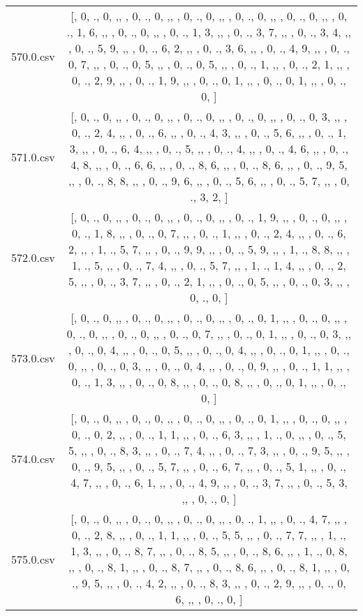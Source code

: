 \begin{table}[ht]
\begin{tabular}{@{}c c@{}}
	570.0.csv & [, 0, ., 0, ,,  , 0, ., 0, ,,  , 0, ., 0, ,,  , 0, ., 0, ,,  , 0, ., 0, ,,  , 0, ., 1, 6, ,,  , 0, ., 0, ,,  , 0, ., 1, 3, ,,  , 0, ., 3, 7, ,,  , 0, ., 3, 4, ,,  , 0, ., 5, 9, ,,  , 0, ., 6, 2, ,,  , 0, ., 3, 6, ,,  , 0, ., 4, 9, ,,  , 0, ., 0, 7, ,,  , 0, ., 0, 5, ,,  , 0, ., 0, 5, ,,  , 0, ., 1, ,,  , 0, ., 2, 1, ,,  , 0, ., 2, 9, ,,  , 0, ., 1, 9, ,,  , 0, ., 0, 1, ,,  , 0, ., 0, 1, ,,  , 0, ., 0, ]\\ 
	571.0.csv & [, 0, ., 0, ,,  , 0, ., 0, ,,  , 0, ., 0, ,,  , 0, ., 0, ,,  , 0, ., 0, 3, ,,  , 0, ., 2, 4, ,,  , 0, ., 6, ,,  , 0, ., 4, 3, ,,  , 0, ., 5, 6, ,,  , 0, ., 1, 3, ,,  , 0, ., 6, 4, ,,  , 0, ., 5, ,,  , 0, ., 4, ,,  , 0, ., 4, 6, ,,  , 0, ., 4, 8, ,,  , 0, ., 6, 6, ,,  , 0, ., 8, 6, ,,  , 0, ., 8, 6, ,,  , 0, ., 9, 5, ,,  , 0, ., 8, 8, ,,  , 0, ., 9, 6, ,,  , 0, ., 5, 6, ,,  , 0, ., 5, 7, ,,  , 0, ., 3, 2, ]\\ 
	572.0.csv & [, 0, ., 0, ,,  , 0, ., 0, ,,  , 0, ., 0, ,,  , 0, ., 1, 9, ,,  , 0, ., 0, ,,  , 0, ., 1, 8, ,,  , 0, ., 0, 7, ,,  , 0, ., 1, ,,  , 0, ., 2, 4, ,,  , 0, ., 6, 2, ,,  , 1, ., 5, 7, ,,  , 0, ., 9, 9, ,,  , 0, ., 5, 9, ,,  , 1, ., 8, 8, ,,  , 1, ., 5, ,,  , 0, ., 7, 4, ,,  , 0, ., 5, 7, ,,  , 1, ., 1, 4, ,,  , 0, ., 2, 5, ,,  , 0, ., 3, 7, ,,  , 0, ., 2, 1, ,,  , 0, ., 0, 5, ,,  , 0, ., 0, 3, ,,  , 0, ., 0, ]\\ 
	573.0.csv & [, 0, ., 0, ,,  , 0, ., 0, ,,  , 0, ., 0, ,,  , 0, ., 0, 1, ,,  , 0, ., 0, ,,  , 0, ., 0, ,,  , 0, ., 0, ,,  , 0, ., 0, 7, ,,  , 0, ., 0, 1, ,,  , 0, ., 0, 3, ,,  , 0, ., 0, 4, ,,  , 0, ., 0, 5, ,,  , 0, ., 0, 4, ,,  , 0, ., 0, 1, ,,  , 0, ., 0, ,,  , 0, ., 0, 3, ,,  , 0, ., 0, 4, ,,  , 0, ., 0, 9, ,,  , 0, ., 1, 1, ,,  , 0, ., 1, 3, ,,  , 0, ., 0, 8, ,,  , 0, ., 0, 8, ,,  , 0, ., 0, 1, ,,  , 0, ., 0, ]\\ 
	574.0.csv & [, 0, ., 0, ,,  , 0, ., 0, ,,  , 0, ., 0, ,,  , 0, ., 0, 1, ,,  , 0, ., 0, ,,  , 0, ., 0, 2, ,,  , 0, ., 1, 1, ,,  , 0, ., 6, 3, ,,  , 1, ., 0, ,,  , 0, ., 5, 5, ,,  , 0, ., 8, 3, ,,  , 0, ., 7, 4, ,,  , 0, ., 7, 3, ,,  , 0, ., 9, 5, ,,  , 0, ., 9, 5, ,,  , 0, ., 5, 7, ,,  , 0, ., 6, 7, ,,  , 0, ., 5, 1, ,,  , 0, ., 4, 7, ,,  , 0, ., 6, 1, ,,  , 0, ., 4, 9, ,,  , 0, ., 3, 7, ,,  , 0, ., 5, 3, ,,  , 0, ., 0, ]\\ 
	575.0.csv & [, 0, ., 0, ,,  , 0, ., 0, ,,  , 0, ., 0, ,,  , 0, ., 1, ,,  , 0, ., 4, 7, ,,  , 0, ., 2, 8, ,,  , 0, ., 1, 1, ,,  , 0, ., 5, 5, ,,  , 0, ., 7, 7, ,,  , 1, ., 1, 3, ,,  , 0, ., 8, 7, ,,  , 0, ., 8, 5, ,,  , 0, ., 8, 6, ,,  , 1, ., 0, 8, ,,  , 0, ., 8, 1, ,,  , 0, ., 8, 7, ,,  , 0, ., 8, 6, ,,  , 0, ., 8, 1, ,,  , 0, ., 9, 5, ,,  , 0, ., 4, 2, ,,  , 0, ., 8, 3, ,,  , 0, ., 2, 9, ,,  , 0, ., 0, 6, ,,  , 0, ., 0, ]\\ 

\end{tabular}
\end{table}
